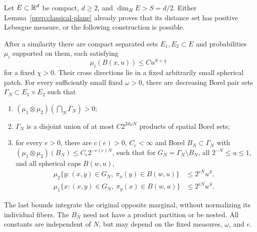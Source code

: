 \begin{proposition}\label{prep:starting-pairs}
Let $E\subset\mathbb R^d$ be compact, $d\ge2$, and
$\dim_HE>S=d/2$. Either Lemma~\ref{prep:classical-plane} already
proves that its distance set has positive Lebesgue measure, or the
following construction is possible.

After a similarity there are compact separated sets $E_1,E_2\subset E$
and probabilities $\mu_i$ supported on them, each satisfying
\[
 \mu_i(B(x,u))\le C u^{S+\chi}
\]
for a fixed $\chi>0$. Their cross directions lie in a fixed
arbitrarily small spherical patch. For every sufficiently small fixed
$\omega>0$, there are decreasing Borel pair sets
$\Gamma_N\subset E_1\times E_2$ such that
\begin{enumerate}
\item $(\mu_1\otimes\mu_2)(\bigcap_N\Gamma_N)>0$;
\item $\Gamma_N$ is a disjoint union of at most $C2^{2d\omega N}$
products of spatial Borel sets;
\item for every $e>0$, there are $c(e)>0$, $C_e<\infty$ and
Borel $B_N\subset\Gamma_N$ with
$(\mu_1\otimes\mu_2)(B_N)\le C_e2^{-c(e)N}$, such that for
$G_N=\Gamma_N\setminus B_N$, all $2^{-N}\le u\le1$, and
all spherical caps $B(w,u)$,
\begin{align*}
 \mu_2\{y:(x,y)\in G_N,\ \pi_x(y)\in B(w,u)\}
     &\le2^{eN}u^S,\\
 \mu_1\{x:(x,y)\in G_N,\ \pi_y(x)\in B(w,u)\}
     &\le2^{eN}u^S.
\end{align*}
\end{enumerate}
The last bounds integrate the original opposite marginal, without
normalizing its individual fibers. The $B_N$ need not have a product
partition or be nested. All constants are independent of $N$, but
may depend on the fixed measures, $\omega$, and $e$.
\end{proposition}
